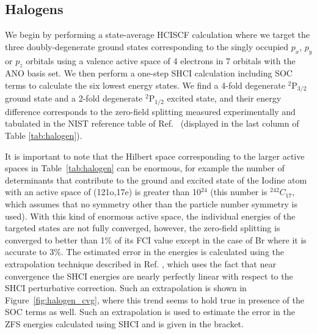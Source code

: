 \documentclass[10pt,aps,prb,twocolumn,amsmath,amssymb,superscriptaddress]{revtex4-1}
\begin{document}
\subsection{Halogens}

We begin by performing a state-average HCISCF calculation where we target the three doubly-degenerate ground states corresponding to the singly occupied $p_x$, $p_y$ or $p_z$ orbitals using a valence active space of 4 electrons in 7 orbitals with the ANO basis set\cite{Roos2004}. We then perform a one-step SHCI calculation including SOC terms to calculate the six lowest energy states. We find a 4-fold degenerate
$^2\text{P}_{3/2}$ ground state and a 2-fold degenerate $^2\text{P}_{1/2}$ excited state, and their energy difference corresponds to the zero-field splitting measured experimentally and tabulated in the NIST reference table of Ref.~ (displayed in the last column of Table \ref{tab:halogen}). 

It is important to note that the Hilbert space corresponding to the larger active spaces in Table~\ref{tab:halogen} can be enormous, for example the number of determinants that contribute to the ground and excited state of the Iodine atom with an active space of (121o,17e) is greater than 10$^{24}$ (this number is $^{242}C_{17}$, which assumes that no symmetry other than the particle number symmetry is used). With this kind of enormous active space, the individual energies of the targeted states
are not fully converged, however, the zero-field splitting is converged to better than 1\% of its FCI value except in the case of Br where it is accurate to 3\%. The estimated error in the energies is calculated using the extrapolation technique described in Ref. , which uses the fact that near convergence the SHCI energies are nearly perfectly linear with respect to the SHCI perturbative correction. Such an extrapolation is shown in Figure~\ref{fig:halogen_cvg}, where this trend
seems to hold true in presence of the SOC terms as well. Such an extrapolation is used to estimate the error in the ZFS energies calculated using SHCI and is given in the bracket. %
\end{document}
